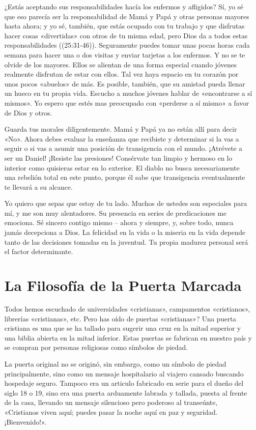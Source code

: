 \documentclass[12pt, twoside, openright]{book}
\begin{document}
¿Estás aceptando sus responsabilidades hacía los enfermos y afligidos? Sí, yo sé que eso parecía ser la responsabilidad de Mamá y Papá y otras personas mayores hasta ahora; y yo sé, también, que estás ocupado con tu trabajo y que disfrutas hacer cosas «divertidas» con otros de tu misma edad, pero Dios da a todos estas responsabilidades ((25:31-46)). Seguramente puedes tomar unas pocas horas cada semana para hacer una o dos visitas y enviar tarjetas a los enfermos. Y no se te olvide de los mayores. Ellos se alientan de una forma especial cuando jóvenes realmente disfrutan de estar con ellos. Tal vez haya espacio en tu corazón por unos pocos «abuelos» de más. Es posible, también, que su amistad pueda llenar un hueco en tu propia vida. Escucho a muchos jóvenes hablar de «encontrarse a sí mismos». Yo espero que estés mas preocupado con «perderse a sí mismo» a favor de Dios y otros.

Guarda tus morales diligentemente. Mamá y Papá ya no están allí para decir «No». Ahora debes evaluar la enseñanza que recibiste y determinar si la vas a seguir o si vas a asumir una posición de transigencia con el mundo. ¡Atrévete a ser un Daniel! ¡Resiste las presiones! Consérvate tan limpio y hermoso en lo interior como quisieras estar en lo exterior. El diablo no busca necesariamente una rebelión total en este punto, porque él sabe que transigencia eventualmente te llevará a su alcance.

Yo quiero que sepas que estoy de tu lado. Muchos de ustedes son especiales para mí, y me son muy alentadores. Su presencia en series de predicaciones me emociona. Sé sincero contigo mismo – ahora y siempre, y, sobre todo, nunca jamás decepciona a Dios. La felicidad en la vida o la miseria en la vida depende tanto de las decisiones tomadas en la juventud. Tu propia madurez personal será el factor determinante. 

\section{La Filosofía de la Puerta Marcada}
Todos hemos escuchado de universidades «cristianas», campamentos «cristianos», librerías «cristianas», etc. Pero has oído de puertas «cristianas»? Una puerta cristiana es una que se ha tallado para sugerir una cruz en la mitad superior y una biblia abierta en la mitad inferior. Estas puertas se fabrican en nuestro país y se compran por personas religiosas como símbolos de piedad.

La puerta original no se originó, sin embargo, como un símbolo de piedad principalmente, sino como un mensaje hospitalario al viajero cansado buscando hospedaje seguro. Tampoco era un articulo fabricado en serie para el dueño del siglo 18 o 19, sino era una puerta arduamente labrada y tallada, puesta al frente de la casa, llevando un mensaje silencioso pero poderoso al transeúnte, «Cristianos viven aquí; puedes pasar la noche aquí en paz y seguridad. ¡Bienvenido!».
\end{document}
